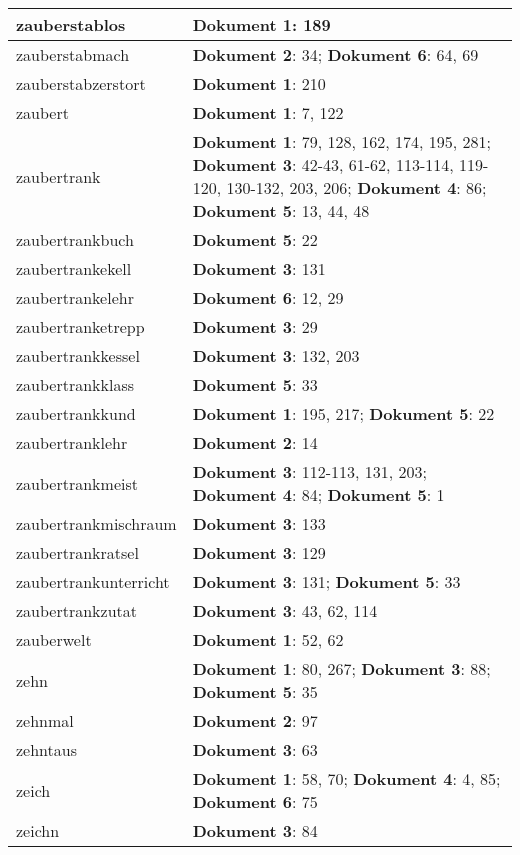 \documentclass[a5paper]{article}
\begin{document}
\begin{longtable}[l]{|l|p{3in}|}
\hline
zauberstablos & \textbf{Dokument 1}: 189 \\
\hline
zauberstabmach & \textbf{Dokument 2}: 34; \textbf{Dokument 6}: 64, 69 \\
\hline
zauberstabzerstort & \textbf{Dokument 1}: 210 \\
\hline
zaubert & \textbf{Dokument 1}: 7, 122 \\
\hline
zaubertrank & \textbf{Dokument 1}: 79, 128, 162, 174, 195, 281; \textbf{Dokument 3}: 42-43, 61-62, 113-114, 119-120, 130-132, 203, 206; \textbf{Dokument 4}: 86; \textbf{Dokument 5}: 13, 44, 48 \\
\hline
zaubertrankbuch & \textbf{Dokument 5}: 22 \\
\hline
zaubertrankekell & \textbf{Dokument 3}: 131 \\
\hline
zaubertrankelehr & \textbf{Dokument 6}: 12, 29 \\
\hline
zaubertranketrepp & \textbf{Dokument 3}: 29 \\
\hline
zaubertrankkessel & \textbf{Dokument 3}: 132, 203 \\
\hline
zaubertrankklass & \textbf{Dokument 5}: 33 \\
\hline
zaubertrankkund & \textbf{Dokument 1}: 195, 217; \textbf{Dokument 5}: 22 \\
\hline
zaubertranklehr & \textbf{Dokument 2}: 14 \\
\hline
zaubertrankmeist & \textbf{Dokument 3}: 112-113, 131, 203; \textbf{Dokument 4}: 84; \textbf{Dokument 5}: 1 \\
\hline
zaubertrankmischraum & \textbf{Dokument 3}: 133 \\
\hline
zaubertrankratsel & \textbf{Dokument 3}: 129 \\
\hline
zaubertrankunterricht & \textbf{Dokument 3}: 131; \textbf{Dokument 5}: 33 \\
\hline
zaubertrankzutat & \textbf{Dokument 3}: 43, 62, 114 \\
\hline
zauberwelt & \textbf{Dokument 1}: 52, 62 \\
\hline
zehn & \textbf{Dokument 1}: 80, 267; \textbf{Dokument 3}: 88; \textbf{Dokument 5}: 35 \\
\hline
zehnmal & \textbf{Dokument 2}: 97 \\
\hline
zehntaus & \textbf{Dokument 3}: 63 \\
\hline
zeich & \textbf{Dokument 1}: 58, 70; \textbf{Dokument 4}: 4, 85; \textbf{Dokument 6}: 75 \\
\hline
zeichn & \textbf{Dokument 3}: 84 \\

\end{longtable}
\end{document}
